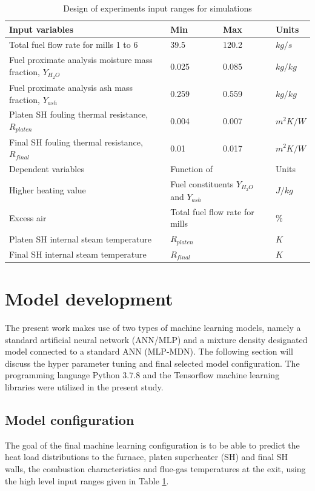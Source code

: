 \documentclass[a4paper,fleqn]{cas-sc}
\begin{document}
\begin{table}[h!]
\caption{Design of experiments input ranges for  simulations}\label{tbl_doe}
\begin{tabular*}{\tblwidth}{p{}p{}p{}p{}}
\toprule
 Input variables& Min& Max& Units \\ %
\midrule
 Total fuel flow rate for mills 1 to 6 & 39.5 & 120.2 & $kg/s$ \\
 Fuel proximate analysis moisture mass fraction, $Y_{H_2O}$ & 0.025 & 0.085 & $kg/kg$ \\
 Fuel proximate analysis ash mass fraction, $Y_{ash}$  & 0.259 & 0.559 & $kg/kg$ \\
 Platen SH fouling thermal resistance, $R_{platen}$  & 0.004 & 0.007 & $m^2K/W$ \\
 Final SH fouling thermal resistance, $R_{final}$  &0.01 & 0.017 & $m^2K/W$ \\
\midrule
Dependent variables& \multicolumn{2}{l}{Function of}& Units\\
\midrule
Higher heating value&\multicolumn{2}{l}{Fuel constituents $Y_{H_2O}$ and $Y_{ash}$}&$J/kg$\\
Excess air & \multicolumn{2}{l}{Total fuel flow rate for mills} & $\%$\\
Platen SH internal steam temperature& \multicolumn{2}{l}{$R_{platen}$} & $K$\\
Final SH internal steam temperature& \multicolumn{2}{l}{$R_{final}$} & $K$\\
\bottomrule
\end{tabular*}
\end{table}
\section{Model development}
The present work makes use of two types of machine learning models, namely a standard artificial neural network (ANN/MLP) and a mixture density designated model connected to a standard ANN (MLP-MDN). The following section will discuss the hyper parameter tuning and final selected model configuration. The programming language Python 3.7.8 and the Tensorflow machine learning libraries were utilized in the present study. 
\subsection{Model configuration}
The goal of the final machine learning configuration is to be able to predict the heat load distributions to the furnace, platen superheater (SH) and final SH walls, the combustion characteristics and flue-gas temperatures at the exit, using the high level input ranges given in Table \ref{tbl_doe}.\\
\end{document}
